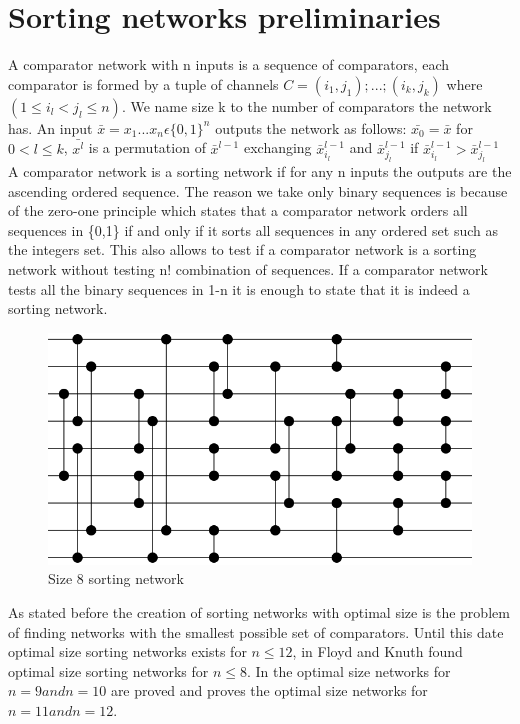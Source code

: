\documentclass[../main.tex]{subfiles}
\begin{document}
	\section{Sorting networks preliminaries}
	A comparator network with n inputs is a sequence of comparators, each comparator is formed by a tuple of channels $C=(i_1,j_1);...;(i_k,j_k)$ where $(1 \leq i_l < j_l \leq n)$. We name size k to the number of comparators the network has. An input $\bar{x}=x_1...x_n \epsilon \{0, 1\}^n$ outputs the network as follows: $\bar{x_0}=\bar{x}$ for $0<l\leq k$, $\bar{x^l}$ is a permutation of $\bar x^{l-1}$ exchanging $\bar x^{l-1}_{i_l}$ and $\bar x^{l-1}_{j_l}$ if $\bar x^{l-1}_{i_l} > \bar x^{l-1}_{j_l}$
	A comparator network is a sorting network if for any n inputs the outputs are the ascending ordered sequence. The reason we take only binary sequences is because of the zero-one principle\cite{knuth1997art} which states that a comparator network orders all sequences in \{0,1\} if and only if it sorts all sequences in any ordered set such as the integers set. This also allows to test if a comparator network is a sorting network without testing n! combination of sequences. If a comparator network tests all the binary sequences in 1-n it is enough to state that it is indeed a sorting network.
	
	\begin{figure}[H]
		\centering
		\includegraphics[scale=0.8]{images/Size8SortingNetwork}
		\caption{Size 8 sorting network}
		\label{fig:images/Size8SortingNetwork}
	\end{figure}

	As stated before the creation of sorting networks with optimal size is the problem of finding networks with the smallest possible set of comparators. Until this date optimal size sorting networks exists for $n \leq 12$, in \cite{FLOYD1973163} Floyd and Knuth found optimal size sorting networks for $n \leq 8$. In \cite{sortingnineinputs} the optimal size networks for $n = 9 and n = 10$ are proved and \cite{harder2021answer} proves the optimal size networks for $n = 11 and n = 12$.
	
	
	
\end{document}
